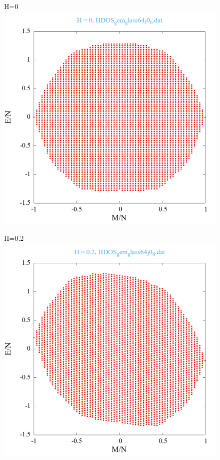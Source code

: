 \documentclass[utf8, babel, sor, jor, amsmath, amssymb, reprint]{elsarticle} %
\begin{document}
\begin{figure}[H]
	\begin{minipage}[h]{0.45\linewidth}
		\centering H=0
		\includegraphics[width=1\linewidth]{pictures/HDOS_gem_glass64_J0_6.dat_H0.png}
	\end{minipage}
	\hfill
	\begin{minipage}[h]{0.45\linewidth}
		\centering H=0.2
		\includegraphics[width=1\linewidth]{pictures/HDOS_gem_glass64_J0_6.dat_H0.2.png}

\end{minipage}
\end{figure}
\end{document}
